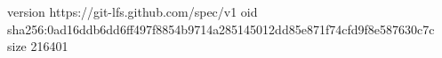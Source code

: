 version https://git-lfs.github.com/spec/v1
oid sha256:0ad16ddb6dd6ff497f8854b9714a285145012dd85e871f74cfd9f8e587630c7c
size 216401
